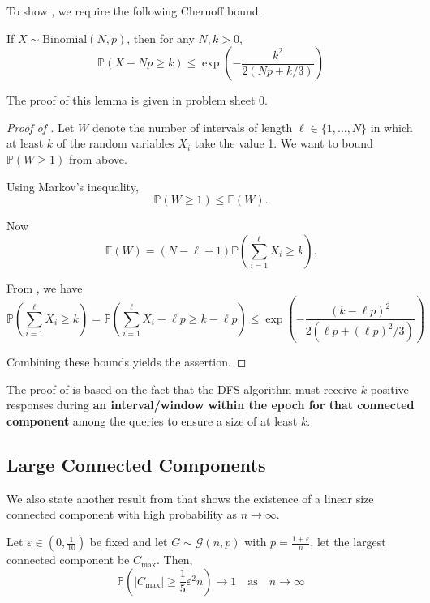 \documentclass{article}
\begin{document}
To show , we require the following Chernoff bound.  

\begin{lemma}\label{lem:chernoff}
    If $X\sim \text{Binomial}(N,p)$, then for any $N, k >0$,
    \begin{equation*}
        \mathbb{P}(X-N p\geq k)\leq \exp\left(-{\frac{k^{2}}{2(N p+k/3)}}\right)
    \end{equation*}
\end{lemma}

The proof of this lemma is given in problem sheet 0.  

\begin{proof}[Proof of ]
    Let $W$ denote the number of intervals of length $\ell \in \{1, \ldots, N\}$ in which at least $k$ of the random variables $X_i$ take the value 1. We want to bound $\mathbb{P}(W \geq 1)$ from above.

    Using Markov's inequality,
    \[
    \mathbb{P}(W \geq 1) \leq \mathbb{E}(W).
    \]
    
    Now
    \[
    \mathbb{E}(W) = (N - \ell + 1)\mathbb{P}\left(\sum_{i=1}^{\ell} X_i \geq k \right).
    \]
    
    From , we have
    \[
    \mathbb{P}\left(\sum_{i=1}^{\ell} X_i \geq k\right) = \mathbb{P}\left(\sum_{i=1}^{\ell} X_i - \ell p \geq k - \ell p\right) \leq \exp \left(-\frac{(k-\ell p)^2}{2(\ell p+(\ell p)^2/3)}\right)
    \]
    
    Combining these bounds yields the assertion.
\end{proof}


\begin{remark}
    The proof of  is based on the fact that the DFS algorithm must receive $k$ positive responses during \textbf{an interval/window within the epoch for that connected component} among the queries to ensure a size of at least $k$.
\end{remark}


\subsection{Large Connected Components}

We also state another result from \citep{krivelevich2012phase} that shows the existence of a linear size connected component with high probability as $n\to \infty$.  

\begin{theorem}
    Let $\varepsilon \in (0,\frac{1}{10})$ be fixed and let $G\sim \mathcal{G}(n,p)$ with $p=\frac{1+\varepsilon}{n}$, let the largest connected component be $C_{\max}$. Then,
    \begin{equation*}
        \mathbb{P}(|C_{\max}|\geq \frac{1}{5}\varepsilon^2 n)\to 1 \quad \text{as} \quad n\to \infty
    \end{equation*}
\end{theorem}
\end{document}
